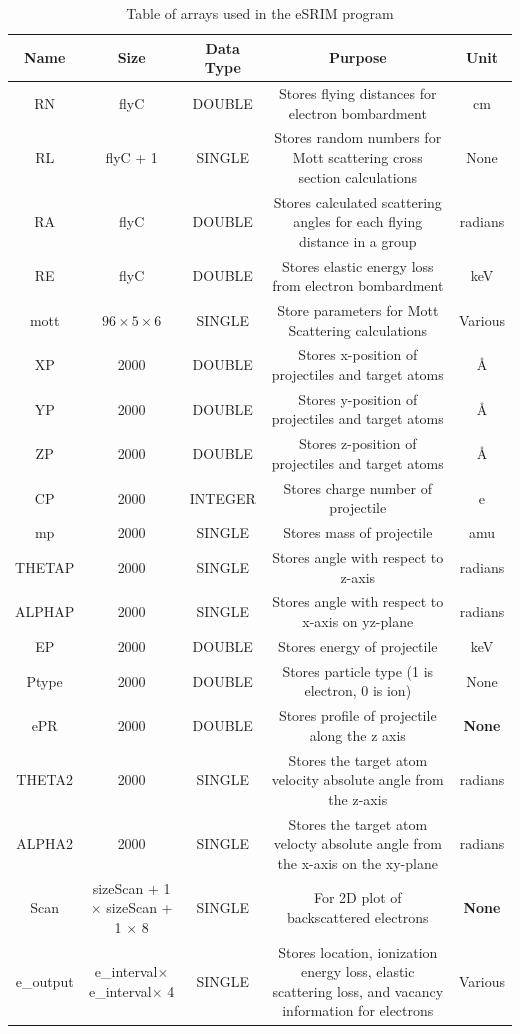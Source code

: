 \documentclass[10pt, reqno]{exam}
\begin{document}
\begin{table}[h]
    \centering
    \caption{Table of arrays used in the eSRIM program}
    \footnotesize
    \begin{tabular}{|c|c|c|c|c|}
        \hline
        Name & Size & Data Type & Purpose & Unit \\
        \hline
        RN  & flyC & DOUBLE & Stores flying distances for electron bombardment & \si{cm} \\
        RL  & flyC + 1 & SINGLE & Stores random numbers for Mott scattering cross section calculations & None \\
        RA  & flyC & DOUBLE & Stores calculated scattering angles for each flying distance in a group & radians \\
        RE  & flyC & DOUBLE & Stores elastic energy loss from electron bombardment & keV \\
        mott & $96\times 5\times 6$ & SINGLE & Store parameters for Mott Scattering calculations & Various \\
        XP & 2000 & DOUBLE & Stores x-position of projectiles and target atoms & \si{\angstrom} \\
        YP & 2000 & DOUBLE & Stores y-position of projectiles and target atoms & \si{\angstrom} \\
        ZP & 2000 & DOUBLE & Stores z-position of projectiles and target atoms & \si{\angstrom} \\
        CP & 2000 & INTEGER & Stores charge number of projectile & e \\
        mp & 2000 & SINGLE & Stores mass of projectile & amu \\
        THETAP & 2000 & SINGLE & Stores angle with respect to z-axis & radians \\
        ALPHAP & 2000 & SINGLE & Stores angle with respect to x-axis on yz-plane & radians \\
        EP & 2000 & DOUBLE & Stores energy of projectile & keV \\
        Ptype & 2000 & DOUBLE & Stores particle type (1 is electron, 0 is ion) & None \\
        ePR & 2000 & DOUBLE & Stores profile of projectile along the z axis & \textbf{None} \\
        THETA2 & 2000 & SINGLE & Stores the target atom velocity absolute angle from the z-axis & radians \\
        ALPHA2 & 2000 & SINGLE & Stores the target atom velocty absolute angle from the x-axis on the xy-plane & radians \\
        Scan & sizeScan + 1 $\times$ sizeScan + 1 $\times$ 8 & SINGLE & For 2D plot of backscattered electrons & \textbf{None} \\
        e\_output & e\_interval$\times$ e\_interval$\times$ 4  &  SINGLE  & Stores location, ionization energy loss, elastic scattering loss, and vacancy information for electrons & Various   \\
        \hline
    \end{tabular}
    \label{tbl:arrays} \\
\end{table}
\end{document}
